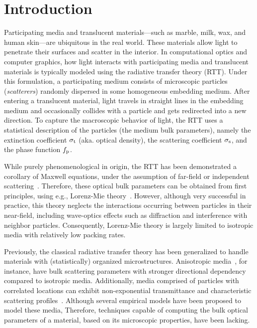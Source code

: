 \section{Introduction}
\label{sec:intro}
%
Participating media and translucent materials---such as marble, milk, wax, and human skin---are ubiquitous in the real world. These materials allow light to penetrate their surfaces and scatter in the interior. 
%
In computational optics and computer graphics, how light interacts with participating media and translucent materials is typically modeled using the radiative transfer theory (RTT). Under this formulation, a participating medium consists of microscopic particles (\emph{scatterers}) randomly dispersed in some homogeneous embedding medium. After entering a translucent material, light travels in straight lines in the embedding medium and occasionally collides with a particle and gets redirected into a new direction. To capture the macroscopic behavior of light, the RTT uses a statistical description of the particles (the medium bulk parameters), namely the extinction coefficient $\sigma_\mathrm{t}$ (aka. optical density), the scattering coefficient $\sigma_\mathrm{s}$, and the phase function $f_\mathrm{p}$.

While purely phenomenological in origin, the RTT has been demonstrated a corollary of Maxwell equations, under the assumption of far-field or independent scattering~\cite{mishchenko2002vector}. Therefore, these optical bulk parameters can be obtained from first principles, using e.g., Lorenz-Mie theory~\cite{hulst1981light,frisvad2007computing}. However, although very successful in practice, this theory neglects the interactions occurring between particles in their near-field, including wave-optics effects such as diffraction and interference with neighbor particles.  Consequently, Lorenz-Mie theory is largely limited to isotropic media with relatively low packing rates.  

Previously, the classical radiative transfer theory has been generalized to handle materials with (statistically) organized microstructures. 
Anisotropic media~\cite{jakob2010radiative}, for instance, have bulk scattering parameters with stronger directional dependency compared to isotropic media.
Additionally, media comprised of particles with correlated locations can exhibit non-exponential transmittance and characteristic scattering profiles~\cite{bitterli2018radiative,jarabo2018radiative}.
Although several empirical models have been proposed to model these media, Therefore, techniques capable of computing the bulk optical parameters of a material, based on its microscopic properties, have been lacking.

